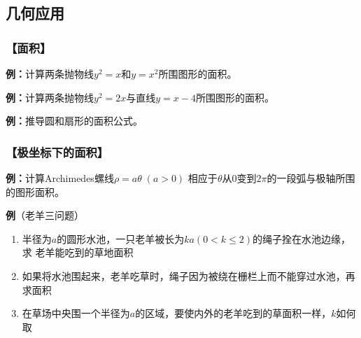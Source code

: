 \subsection{几何应用}

\subsubsection{【面积】}

{\bf 例：}计算两条抛物线$y^2=x$和$y=x^2$所围图形的面积。

{\bf 例：}计算两条抛物线$y^2=2x$与直线$y=x-4$所围图形的面积。

{\bf 例：}推导圆和扇形的面积公式。

\subsubsection{【极坐标下的面积】}

{\bf 例：}计算Archimedes螺线$\rho=a\theta\;(a>0)$
相应于$\theta$从$0$变到$2\pi$的一段弧与极轴所围的图形面积。

\begin{center}
\end{center}

{\bf 例}（老羊三问题）
\begin{enumerate}[(1)]
  \setlength{\itemindent}{1cm}
  \item 半径为$a$的圆形水池，一只老羊被长为$ka(0<k\leq2)$的绳子拴在水池边缘，求
  老羊能吃到的草地面积
  \item 如果将水池围起来，老羊吃草时，绳子因为被绕在栅栏上而不能穿过水池，再求面积
  \item 在草场中央围一个半径为$a$的区域，要使内外的老羊吃到的草面积一样，$k$如何取
\end{enumerate}

